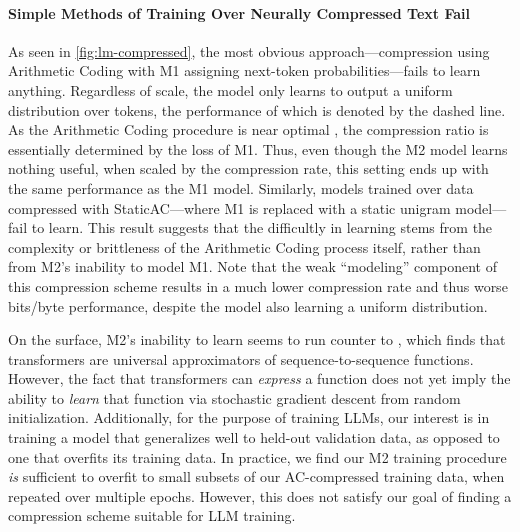 \paragraph{Simple Methods of Training Over Neurally Compressed Text Fail} As seen in \ref{fig:lm-compressed}, the most obvious approach---compression using Arithmetic Coding with M1 assigning next-token probabilities---fails to learn anything. Regardless of scale, the model only learns to output a uniform distribution over tokens, the performance of which is denoted by the dashed line. As the Arithmetic Coding procedure is near optimal \cite{mahoneyDataCompressionExplained2013}, the compression ratio is essentially determined by the loss of M1\@. Thus, even though the M2 model learns nothing useful, when scaled by the compression rate, this setting ends up with the same performance as the M1 model. Similarly, models trained over data compressed with StaticAC---where M1 is replaced with a static unigram model---fail to learn. This result suggests that the difficultly in learning stems from the complexity or brittleness of the Arithmetic Coding process itself, rather than from M2's inability to model M1\@. Note that the weak ``modeling'' component of this compression scheme results in a much lower compression rate and thus worse bits/byte performance, despite the model also learning a uniform distribution.

On the surface, M2's inability to learn seems to run counter to \citet{yunTransformersUniversalApproximators2020}, which finds that transformers are universal approximators of sequence-to-sequence functions. However, the fact that transformers can \emph{express} a function does not yet imply the ability to \emph{learn} that function via stochastic gradient descent from random initialization. Additionally, for the purpose of training LLMs, our interest is in training a model that generalizes well to held-out validation data, as opposed to one that overfits its training data. In practice, we find our M2 training procedure \emph{is} sufficient to overfit to small subsets of our AC-compressed training data, when repeated over multiple epochs. However, this does not satisfy our goal of finding a compression scheme suitable for LLM training.


